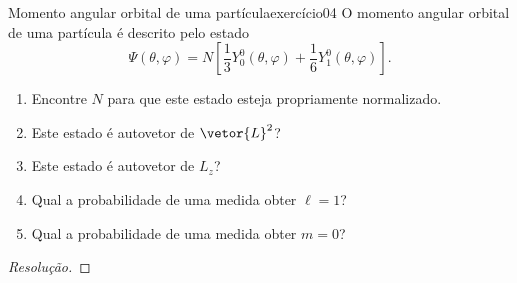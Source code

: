 \begin{exercício}{Momento angular orbital de uma partícula}{exercício04}
    O momento angular orbital de uma partícula é descrito pelo estado
    \begin{equation*}
        \Psi(\theta,\varphi) = N\left[\frac{1}{3}Y_0^0(\theta,\varphi) + \frac16 Y_{1}^0 (\theta, \varphi)\right].
    \end{equation*}
    \begin{enumerate}[label=(\alph*)]
        \item Encontre \(N\) para que este estado esteja propriamente normalizado.
        \item Este estado é autovetor de \(\vetor{L}^2\)?
        \item Este estado é autovetor de \(L_z\)?
        \item Qual a probabilidade de uma medida obter \(\ell = 1\)?
        \item Qual a probabilidade de uma medida obter \(m = 0\)?
    \end{enumerate}
\end{exercício}
\begin{proof}[Resolução]

\end{proof}
